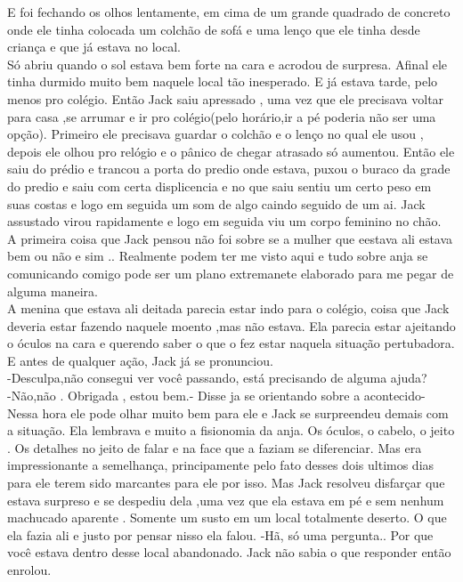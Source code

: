\documentclass{book}
\begin{document}
E foi fechando os olhos lentamente, em cima de um grande quadrado de concreto onde ele tinha colocada um colchão de sofá e uma lenço que ele tinha desde criança e que já estava no local. \\
Só abriu quando o sol estava bem forte na cara e acrodou de surpresa. Afinal ele tinha durmido muito bem naquele local tão  inesperado. E já estava tarde, pelo menos pro colégio. Então Jack saiu apressado , uma vez que ele precisava voltar para casa ,se arrumar e ir pro colégio(pelo horário,ir a pé poderia não ser uma opção). Primeiro ele precisava guardar o colchão e o lenço no qual ele usou , depois ele olhou pro relógio e o pânico de chegar atrasado só aumentou. Então ele saiu do prédio e trancou a porta do predio onde estava, puxou o buraco da grade do predio e saiu com certa displicencia e no que saiu sentiu um certo peso em suas costas e logo em seguida um som de algo caindo seguido de um ai. Jack assustado virou rapidamente e logo em seguida viu um corpo feminino no chão. \\
A primeira coisa que Jack pensou não foi sobre se a mulher que eestava ali estava bem ou não e sim .. Realmente podem ter me visto aqui e tudo sobre anja se comunicando comigo pode ser um plano extremanete elaborado para me pegar de alguma maneira.\\
A menina que estava ali deitada parecia estar indo para o colégio, coisa que Jack deveria estar fazendo naquele moento ,mas não estava. Ela parecia estar ajeitando o óculos na cara e querendo saber o que o fez estar naquela situação pertubadora. E	antes de qualquer ação, Jack já se pronunciou. \\
-Desculpa,não consegui ver você passando, está precisando de alguma ajuda?\\
-Não,não . Obrigada , estou bem.- Disse ja se orientando sobre a acontecido- Nessa hora ele pode olhar muito bem para ele e Jack se surpreendeu demais com a situação. Ela lembrava e muito a fisionomia da anja. Os óculos, o cabelo, o jeito . Os detalhes no jeito de falar e na face que a faziam se diferenciar. Mas era impressionante a semelhança, principamente pelo fato desses dois ultimos dias para ele terem sido marcantes para ele por isso. Mas Jack resolveu disfarçar que estava surpreso e se despediu dela ,uma vez que ela estava em pé e sem nenhum machucado aparente . Somente um susto em um local totalmente deserto. O que ela fazia ali e justo por pensar nisso ela falou.
-Hã, só uma pergunta.. Por que você estava dentro desse local abandonado. Jack não sabia o que responder então enrolou. 
\end{document}
